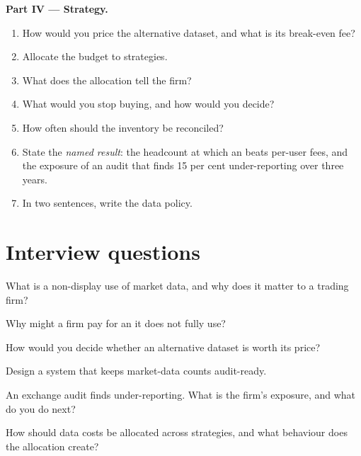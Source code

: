 \begin{problem}
\medskip\noindent\textbf{Part IV --- Strategy.}
\begin{enumerate}[resume]
\item How would you price the alternative dataset, and what is its break-even fee?
\item Allocate the budget to strategies.
\item What does the allocation tell the firm?
\item What would you stop buying, and how would you decide?
\item How often should the inventory be reconciled?
\item State the \emph{named result}: the headcount at which an  beats per-user fees, and the  exposure of an audit that
finds 15 per cent under-reporting over three years.
\item In two sentences, write the data policy.
\end{enumerate}
\end{problem}

\section{Interview questions}

\begin{interviewq}\label{iq:fm:data-strategy-and-costs:1}
What is a non-display use of market data, and why does it matter to a trading firm?
\end{interviewq}

\begin{interviewq}\label{iq:fm:data-strategy-and-costs:2}
Why might a firm pay for an  it does not fully use?
\end{interviewq}

\begin{interviewq}\label{iq:fm:data-strategy-and-costs:3}
How would you decide whether an alternative dataset is worth its price?
\end{interviewq}

\begin{interviewq}\label{iq:fm:data-strategy-and-costs:4}
Design a system that keeps market-data counts audit-ready.
\end{interviewq}

\begin{interviewq}\label{iq:fm:data-strategy-and-costs:5}
An exchange audit finds under-reporting. What is the firm's exposure, and what do you do next?
\end{interviewq}

\begin{interviewq}\label{iq:fm:data-strategy-and-costs:6}
How should data costs be allocated across strategies, and what behaviour does the allocation create?
\end{interviewq}
